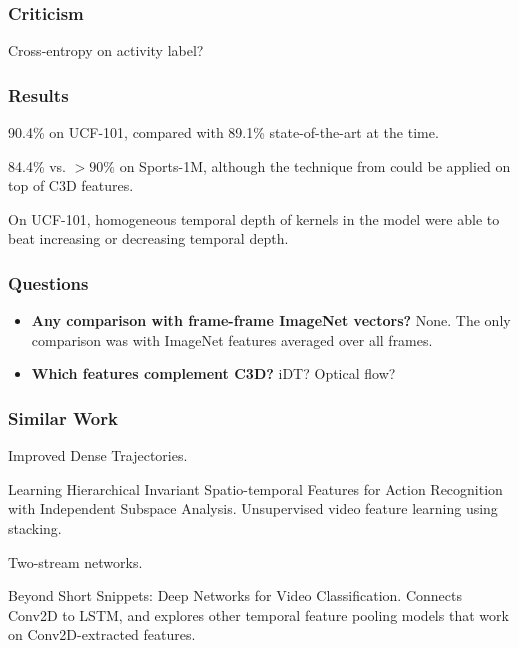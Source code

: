 \documentclass[a4paper, 12pt]{article}
\begin{document}
\subsubsection{Criticism}

Cross-entropy on activity label?

\subsubsection{Results}

90.4\% on UCF-101, compared with 89.1\% state-of-the-art at the time.

84.4\% vs. $> 90\%$ on Sports-1M, although the technique
from\citet{DBLP:journals/corr/NgHVVMT15} could be applied on top of C3D
features.

On UCF-101, homogeneous temporal depth of kernels in the model were able to
beat increasing or decreasing temporal depth.

\subsubsection{Questions}

\begin{itemize}
\item \textbf{Any comparison with frame-frame ImageNet vectors?} None. The only
        comparison was with ImageNet features averaged over all frames.

\item \textbf{Which features complement C3D?} iDT\@? Optical flow?
\end{itemize}

\subsubsection{Similar Work}

Improved Dense Trajectories\citet{Wang2013}.

Learning Hierarchical Invariant Spatio-temporal Features for Action Recognition
with Independent Subspace Analysis\citet{Le:2011:LHI:2191740.2192108}.
Unsupervised video feature learning using stacking.

Two-stream networks\citet{DBLP:journals/corr/SimonyanZ14}.

Beyond Short Snippets: Deep Networks for Video
Classification\citet{DBLP:journals/corr/NgHVVMT15}. Connects Conv2D to LSTM, and
explores other temporal feature pooling models that work on Conv2D-extracted
features.
\end{document}
